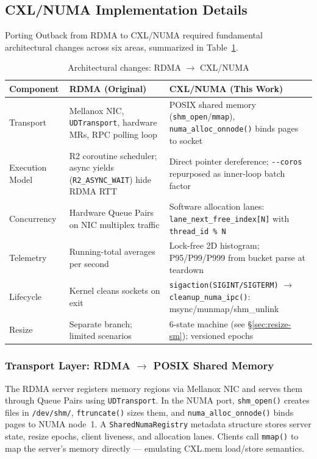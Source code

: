 \documentclass[11pt,a4paper]{article}
\begin{document}
\subsection{CXL/NUMA Implementation Details}

Porting Outback from RDMA to CXL/NUMA required fundamental architectural changes across six areas, summarized in Table~\ref{tab:impl-comparison}.

\begin{table}[H]
\centering
\caption{Architectural changes: RDMA $\to$ CXL/NUMA}
\label{tab:impl-comparison}
\small
\begin{tabular}{@{}p{2.8cm}p{5cm}p{5.5cm}@{}}
\toprule
\textbf{Component} & \textbf{RDMA (Original)} & \textbf{CXL/NUMA (This Work)} \\
\midrule
Transport &
  Mellanox NIC, \texttt{UDTransport}, hardware MRs, RPC polling loop &
  POSIX shared memory (\texttt{shm\_open}/\texttt{mmap}), \texttt{numa\_alloc\_onnode()} binds pages to socket \\
\addlinespace
Execution Model &
  R2 coroutine scheduler; async yields (\texttt{R2\_ASYNC\_WAIT}) hide RDMA RTT &
  Direct pointer dereference; \texttt{-{}-coros} repurposed as inner-loop batch factor \\
\addlinespace
Concurrency &
  Hardware Queue Pairs on NIC multiplex traffic &
  Software allocation lanes: \texttt{lane\_next\_free\_index[N]} with \texttt{thread\_id \% N} \\
\addlinespace
Telemetry &
  Running-total averages per second &
  Lock-free 2D histogram; P95/P99/P999 from bucket parse at teardown \\
\addlinespace
Lifecycle &
  Kernel cleans sockets on exit &
  \texttt{sigaction(SIGINT/SIGTERM)} $\to$ \texttt{cleanup\_numa\_ipc()}: msync/munmap/shm\_unlink \\
\addlinespace
Resize &
  Separate branch; limited scenarios &
  6-state machine (see \S\ref{sec:resize-sm}); versioned epochs \\
\bottomrule
\end{tabular}
\end{table}

\subsubsection{Transport Layer: RDMA $\to$ POSIX Shared Memory}
The RDMA server registers memory regions via Mellanox NIC and serves them through Queue Pairs using \texttt{UDTransport}. In the NUMA port, \texttt{shm\_open()} creates files in \texttt{/dev/shm/}, \texttt{ftruncate()} sizes them, and \texttt{numa\_alloc\_onnode()} binds pages to NUMA node~1. A \texttt{SharedNumaRegistry} metadata structure stores server state, resize epochs, client liveness, and allocation lanes. Clients call \texttt{mmap()} to map the server's memory directly --- emulating CXL.mem load/store semantics.
\end{document}
